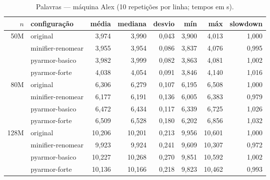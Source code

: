 \begin{table}[ht]\centering\footnotesize
\caption{Palavras --- máquina Alex (10 repetições por linha; tempos em s).}\label{tab:alex-palavras}
\begin{tabular}{rlrrrrrr}\hline
$n$ & configuração & média & mediana & desvio & mín & máx & slowdown \\\hline
50M & original & 3,974 & 3,990 & 0,043 & 3,900 & 4,013 & 1,000 \\
 & minifier-renomear & 3,955 & 3,954 & 0,086 & 3,837 & 4,076 & 0,995 \\
 & pyarmor-basico & 3,982 & 3,999 & 0,082 & 3,863 & 4,081 & 1,002 \\
 & pyarmor-forte & 4,038 & 4,054 & 0,091 & 3,846 & 4,140 & 1,016 \\
\hline
80M & original & 6,306 & 6,279 & 0,107 & 6,195 & 6,508 & 1,000 \\
 & minifier-renomear & 6,177 & 6,191 & 0,136 & 6,005 & 6,383 & 0,979 \\
 & pyarmor-basico & 6,472 & 6,434 & 0,117 & 6,339 & 6,725 & 1,026 \\
 & pyarmor-forte & 6,509 & 6,528 & 0,180 & 6,202 & 6,856 & 1,032 \\
\hline
128M & original & 10,206 & 10,201 & 0,213 & 9,956 & 10,601 & 1,000 \\
 & minifier-renomear & 9,923 & 9,924 & 0,241 & 9,609 & 10,307 & 0,972 \\
 & pyarmor-basico & 10,227 & 10,268 & 0,270 & 9,851 & 10,592 & 1,002 \\
 & pyarmor-forte & 10,136 & 10,166 & 0,218 & 9,823 & 10,462 & 0,993 \\
\hline
\end{tabular}\end{table}

